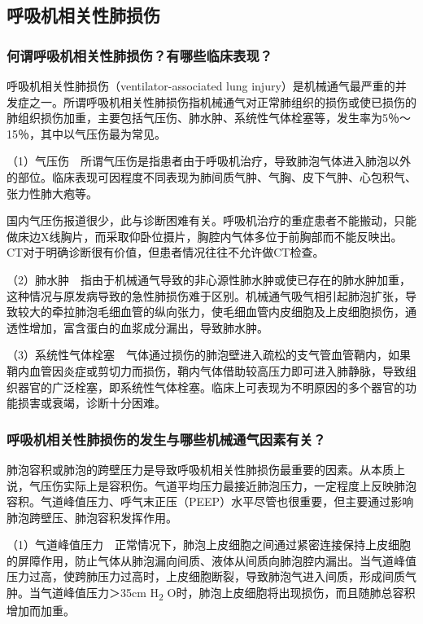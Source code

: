 \subsection{呼吸机相关性肺损伤}

\subsubsection{何谓呼吸机相关性肺损伤？有哪些临床表现？}

呼吸机相关性肺损伤（ventilator-associated lung
injury）是机械通气最严重的并发症之一。所谓呼吸机相关性肺损伤指机械通气对正常肺组织的损伤或使已损伤的肺组织损伤加重，主要包括气压伤、肺水肿、系统性气体栓塞等，发生率为5％～15％，其中以气压伤最为常见。

（1）气压伤　所谓气压伤是指患者由于呼吸机治疗，导致肺泡气体进入肺泡以外的部位。临床表现可因程度不同表现为肺间质气肿、气胸、皮下气肿、心包积气、张力性肺大疱等。

国内气压伤报道很少，此与诊断困难有关。呼吸机治疗的重症患者不能搬动，只能做床边X线胸片，而采取仰卧位摄片，胸腔内气体多位于前胸部而不能反映出。CT对于明确诊断很有价值，但患者情况往往不允许做CT检查。

（2）肺水肿　指由于机械通气导致的非心源性肺水肿或使已存在的肺水肿加重，这种情况与原发病导致的急性肺损伤难于区别。机械通气吸气相引起肺泡扩张，导致较大的牵拉肺泡毛细血管的纵向张力，使毛细血管内皮细胞及上皮细胞损伤，通透性增加，富含蛋白的血浆成分漏出，导致肺水肿。

（3）系统性气体栓塞　气体通过损伤的肺泡壁进入疏松的支气管血管鞘内，如果鞘内血管因炎症或剪切力而损伤，鞘内气体借助较高压力即可进入肺静脉，导致组织器官的广泛栓塞，即系统性气体栓塞。临床上可表现为不明原因的多个器官的功能损害或衰竭，诊断十分困难。

\subsubsection{呼吸机相关性肺损伤的发生与哪些机械通气因素有关？}

肺泡容积或肺泡的跨壁压力是导致呼吸机相关性肺损伤最重要的因素。从本质上说，气压伤实际上是容积伤。气道平均压力最接近肺泡压力，一定程度上反映肺泡容积。气道峰值压力、呼气末正压（PEEP）水平尽管也很重要，但主要通过影响肺泡跨壁压、肺泡容积发挥作用。

（1）气道峰值压力　正常情况下，肺泡上皮细胞之间通过紧密连接保持上皮细胞的屏障作用，防止气体从肺泡漏向间质、液体从间质向肺泡腔内漏出。当气道峰值压力过高，使跨肺压力过高时，上皮细胞断裂，导致肺泡气进入间质，形成间质气肿。当气道峰值压力＞35cm
H\textsubscript{2}
O时，肺泡上皮细胞将出现损伤，而且随肺总容积增加而加重。


